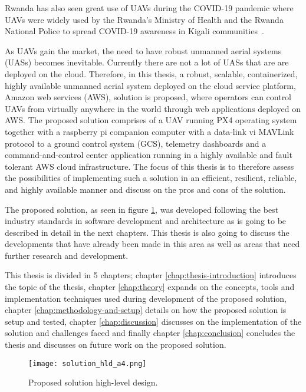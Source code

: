 Rwanda has also seen great use of UAVs during the COVID-19 pandemic where UAVs were widely used by the Rwanda’s Ministry of Health and the Rwanda National Police to spread COVID-19 awareness in Kigali communities~\cite{whoafricarw2020}.

As UAVs gain the market, the need to have robust unmanned aerial systems (UASs) becomes inevitable. Currently there are not a lot of UASs that are are deployed on the cloud. Therefore, in this thesis, a robust, scalable, containerized, highly available unmanned aerial system deployed on the cloud service platform, Amazon web services (AWS), solution is proposed, where operators can control UAVs from virtually anywhere in the world through web applications deployed on AWS. The proposed solution comprises of a UAV running PX4 operating system together with a raspberry pi companion computer with a data-link vi MAVLink protocol to a ground control system (GCS), telemetry dashboards and a command-and-control center application running in a highly available and fault tolerant AWS cloud infrastructure. The focus of this thesis is to therefore assess the possibilities of implementing such a solution in an efficient, resilient, reliable, and highly available manner and discuss on the pros and cons of the solution.

The proposed solution, as seen in figure \ref{fig:solution-hld-a4}, was developed following the best industry standards in software development and architecture as is going to be described in detail in the next chapters. This thesis is also going to discuss the developments that have already been made in this area as well as areas that need further research and development.

This thesis is divided in 5 chapters; chapter \ref{chap:thesis-introduction} introduces the topic of the thesis, chapter \ref{chap:theory} expands on the concepts, tools and implementation techniques used during development of the proposed solution, chapter \ref{chap:methodology-and-setup} details on how the proposed solution is setup and tested, chapter \ref{chap:discussion} discusses on the implementation of the solution and challenges faced and finally chapter \ref{chap:conclusion} concludes the thesis and discusses on future work on the proposed solution.

\begin{figure}[!htbp]
    \centering \texttt{[image: solution\_hld\_a4.png]}
    \caption{Proposed solution high-level design.}
    \label{fig:solution-hld-a4}
\end{figure}


